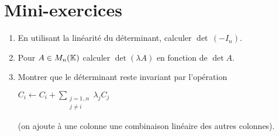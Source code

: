 \section{Mini-exercices}

\begin{frame}
\begin{miniexercice}
\begin{enumerate}
  \item En utilisant la linéarité du déterminant, calculer $\det \, (-I_n)$.
  
  \item Pour $A \in M_n(\mathbb{K})$ calculer $\det (\lambda A)$
  en fonction de $\det A$.
  
  \item Montrer que le déterminant reste invariant par l'opération \\
  \centerline{$C_i \leftarrow C_i+\displaystyle\sum_{{\substack{j=1..n \\ j\neq i}}}\lambda_j C_j$}
  
  (on ajoute à une colonne une combinaison linéaire des autres colonnes).

\end{enumerate}
\end{miniexercice}
\end{frame}

